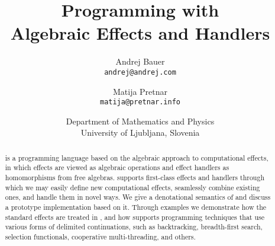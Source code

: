 \documentclass[12pt]{article}
\begin{document}
\title{Programming with \\ Algebraic Effects and Handlers}

\author{
Andrej Bauer\\\texttt{\small andrej@andrej.com}
\and
Matija Pretnar\\\texttt{\small matija@pretnar.info}
}
\date{\small Department of Mathematics and Physics\\
University of Ljubljana, Slovenia}

\maketitle


\begin{abstract}
  \Eff is a programming language based on the algebraic approach to computational effects,
  in which effects are viewed as algebraic operations and effect handlers as homomorphisms
  from free algebras. \Eff supports first-class effects and handlers through which we may
  easily define new computational effects, seamlessly combine existing ones, and handle
  them in novel ways. We give a denotational semantics of \eff and discuss a prototype
  implementation based on it. Through examples we demonstrate how the standard effects
  are treated in \eff, and how \eff supports programming techniques that use various forms
  of delimited continuations, such as backtracking, breadth-first search, selection
  functionals, cooperative multi-threading, and others.
\end{abstract}









%

\end{document}
